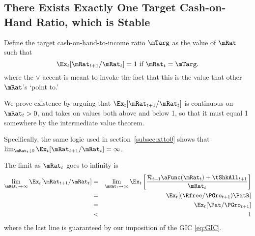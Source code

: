 \documentclass[titlepage]{\econtex}\providecommand{\texname}{BufferStockTheory}%
\begin{document}
{\subsection{There Exists Exactly One Target Cash-on-Hand Ratio,
which is Stable}

\label{subsec:onetarget}

Define the target cash-on-hand-to-income ratio $\mTarg$ as the value of $\mRat$
such that
\begin{equation}  \label{eq:mTarget}
\Ex_t [{\mRat}_{t+1}/\mRat_t] = 1 \mbox{~if~} \mRat_t = \mTarg.
\end{equation}
where the $\vee$ accent is meant to invoke the fact that this is the value that other $\mRat$'s `point to.'

We prove existence by arguing that $\Ex_t [{\mRat}_{t+1}/\mRat_t]$ is
continuous on $\mRat_{t}>0$, %
and takes on values both above and below 1,
so that it must equal 1 somewhere by the intermediate
value theorem.

Specifically, the same logic used in section~\ref{subsec:xtto0} shows
that $\lim_{\mRat_t \downarrow 0} \Ex_t [{\mRat}_{t+1}/\mRat_t] =
\infty$.

The limit as $\mRat_{t}$ goes to infinity is
\begin{eqnarray*}
  \lim_{\mRat_{t} \rightarrow \infty} \Ex_{t}[{\mRat}_{t+1}/\mRat_{t}] & = &   \lim_{\mRat_{t} \rightarrow \infty} \Ex_{t}\left[\frac{{\mathcal{\mathcal{R}}}_{t+1}\aFunc(\mRat_{t})+{\tShkAll}_{t+1}}{\mRat_{t}}\right]
\\ & = & \Ex_{t}[(\Rfree/{\PGro}_{t+1})\PatR]
\\ & = & \Ex_{t}[{\Pat}/{\PGro}_{t+1}]
\\ & < & 1
\end{eqnarray*}
where the last line is guaranteed by our imposition of the GIC \eqref{eq:GIC}.

}
\end{document}
